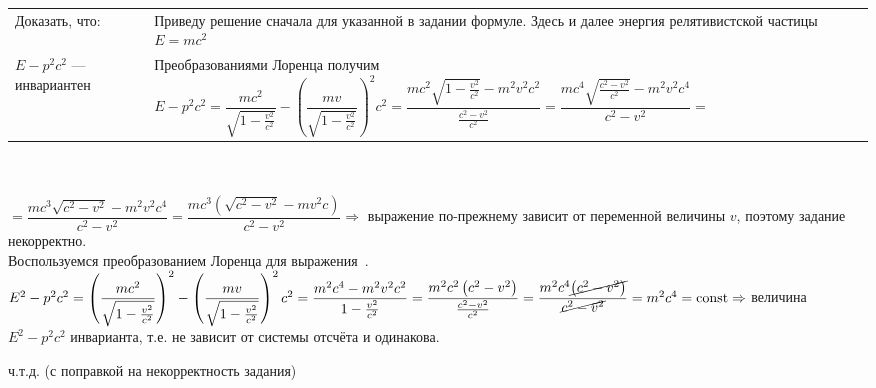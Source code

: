 \documentclass{article}
\newcommand*\squared[1]{\tikz[baseline=(char.base)]{
            \node[shape=rectangle,draw,inner sep=4pt] (char) {#1};}}
\begin{document}
\noindent \begin{tabular}{l|l}
    Доказать, что: & Приведу решение сначала для указанной в задании формуле. Здесь и далее энергия релятивистской частицы $E = mc^2$ \\
    $E-p^2c^2$ --- инвариантен & Преобразованиями Лоренца получим $E - p^2c^2 = \dfrac{mc^2}{\sqrt{1-\frac{v^2}{c^2}}} - \left(\dfrac{mv}{\sqrt{1-\frac{v^2}{c^2}}}\right)^2c^2 = \dfrac{mc^2\sqrt{1-\frac{v^2}{c^2}}-m^2v^2c^2}{\frac{c^2-v^2}{c^2}} = \dfrac{mc^4\sqrt{\frac{c^2-v^2}{c^2}}-m^2v^2c^4}{c^2-v^2} =$ \\
\end{tabular} \\ \, \\
$= \dfrac{mc^3\sqrt{c^2-v^2}-m^2v^2c^4}{c^2-v^2} = \dfrac{mc^3\left (\sqrt{c^2-v^2}-mv^2c\right )}{c^2-v^2} \Rightarrow$ выражение по-прежнему зависит от переменной величины $v$, поэтому задание некорректно. \\
Воспользуемся преобразованием Лоренца для выражения \squared{$E^2 - p^2c^2$}$\,$. \\
$E^2 - p^2c^2 = \left (\dfrac{mc^2}{\sqrt{1-\frac{v^2}{c^2}}}\right )^2 - \left(\dfrac{mv}{\sqrt{1-\frac{v^2}{c^2}}}\right)^2c^2 = \dfrac{m^2c^4 - m^2v^2c^2}{1-\frac{v^2}{c^2}} = \dfrac{m^2c^2\left (c^2 - v^2\right )}{\frac{c^2 - v^2}{c^2}} =\dfrac{m^2c^4\cancel{\left (c^2 - v^2\right )}}{\cancel{c^2 - v^2}} = m^2c^4 = \text{const} \Rightarrow$ величина $E^2 - p^2c^2$ инварианта, т.е. не зависит от системы отсчёта и одинакова.

\begin{flushright}
ч.т.д. (с поправкой на некорректность задания)
\end{flushright}
\end{document}
